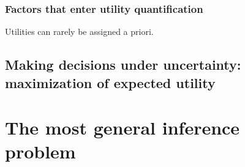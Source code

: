 \documentclass[
  a4paper,
  DIV=11,
  numbers=noendperiod,
  oneside]{scrreprt}
\begin{document}
\hypertarget{factors-that-enter-utility-quantification}{%
\subsection{Factors that enter utility
quantification}\label{factors-that-enter-utility-quantification}}

Utilities can rarely be assigned a priori.

\hypertarget{making-decisions-under-uncertainty-maximization-of-expected-utility}{%
\section{Making decisions under uncertainty: maximization of expected
utility}\label{making-decisions-under-uncertainty-maximization-of-expected-utility}}

\hypertarget{the-most-general-inference-problem}{%
\chapter{The most general inference
problem}\label{the-most-general-inference-problem}}
\end{document}
